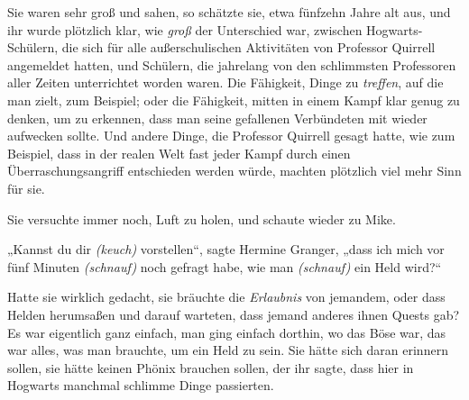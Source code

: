 Sie waren sehr groß und sahen, so schätzte sie, etwa fünfzehn Jahre alt aus, und ihr wurde plötzlich klar, wie \emph{groß} der Unterschied war, zwischen Hogwarts-Schülern, die sich für alle außerschulischen Aktivitäten von Professor Quirrell angemeldet hatten, und Schülern, die jahrelang von den schlimmsten Professoren aller Zeiten unterrichtet worden waren. Die Fähigkeit, Dinge zu \emph{treffen}, auf die man zielt, zum Beispiel; oder die Fähigkeit, mitten in einem Kampf klar genug zu denken, um zu erkennen, dass man seine gefallenen Verbündeten mit  wieder aufwecken sollte. Und andere Dinge, die Professor Quirrell gesagt hatte, wie zum Beispiel, dass in der realen Welt fast jeder Kampf durch einen Überraschungsangriff entschieden werden würde, machten plötzlich viel mehr Sinn für sie.

Sie versuchte immer noch, Luft zu holen, und schaute wieder zu Mike.

„Kannst du dir \emph{(keuch)} vorstellen“, sagte Hermine Granger, „dass ich mich vor fünf Minuten \emph{(schnauf)} noch gefragt habe, wie man \emph{(schnauf)} ein Held wird?“

Hatte sie wirklich gedacht, sie bräuchte die \emph{Erlaubnis} von jemandem, oder dass Helden herumsaßen und darauf warteten, dass jemand anderes ihnen Quests gab? Es war eigentlich ganz einfach, man ging einfach dorthin, wo das Böse war, das war alles, was man brauchte, um ein Held zu sein. Sie hätte sich daran erinnern sollen, sie hätte keinen Phönix brauchen sollen, der ihr sagte, dass hier in Hogwarts manchmal schlimme Dinge passierten.

